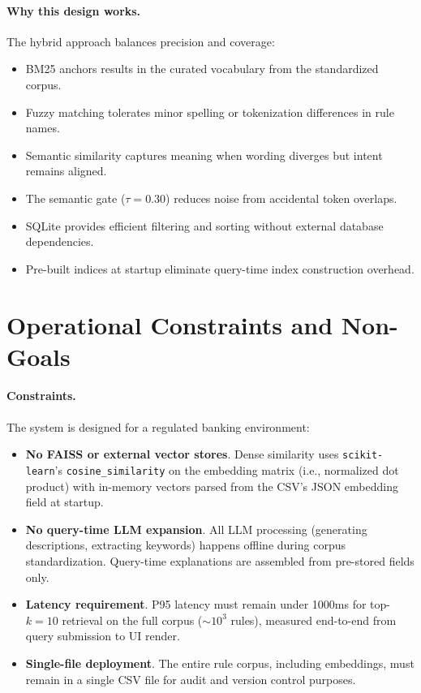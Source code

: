\paragraph{Why this design works.} The hybrid approach balances precision and coverage:
\begin{itemize}[leftmargin=*,itemsep=2pt,topsep=2pt]
 \item BM25 anchors results in the curated vocabulary from the standardized corpus.
 \item Fuzzy matching tolerates minor spelling or tokenization differences in rule names.
 \item Semantic similarity captures meaning when wording diverges but intent remains aligned.
 \item The semantic gate ($\tau=0.30$) reduces noise from accidental token overlaps.
 \item SQLite provides efficient filtering and sorting without external database dependencies.
 \item Pre-built indices at startup eliminate query-time index construction overhead.
\end{itemize}

\section{Operational Constraints and Non-Goals}
\paragraph{Constraints.} The system is designed for a regulated banking environment:
\begin{itemize}[leftmargin=*,itemsep=2pt,topsep=2pt]
 \item \textbf{No FAISS or external vector stores}. Dense similarity uses \texttt{scikit-learn}'s \texttt{cosine\_similarity} on the embedding matrix (i.e., normalized dot product) with in-memory vectors parsed from the CSV's JSON embedding field at startup.
 \item \textbf{No query-time LLM expansion}. All LLM processing (generating descriptions, extracting keywords) happens offline during corpus standardization. Query-time explanations are assembled from pre-stored fields only.
 \item \textbf{Latency requirement}. P95 latency must remain under 1000ms for top-$k{=}10$ retrieval on the full corpus (${\sim}10^3$ rules), measured end-to-end from query submission to UI render.
 \item \textbf{Single-file deployment}. The entire rule corpus, including embeddings, must remain in a single CSV file for audit and version control purposes.
\end{itemize}
